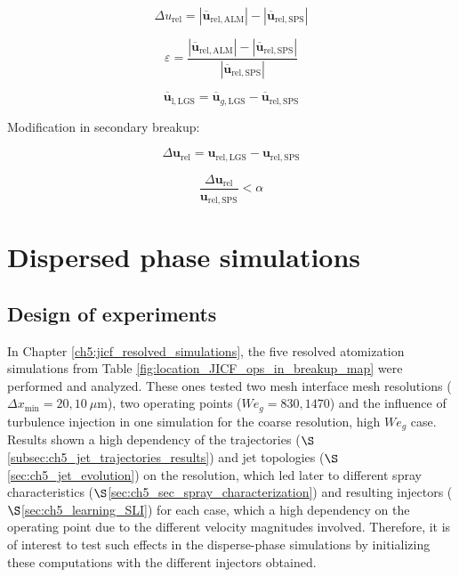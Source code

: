 \begin{equation}
\Delta u_\mathrm{rel} = | \overline{\textbf{u}}_\mathrm{rel,ALM}| - |\overline{\textbf{u}}_\mathrm{rel,SPS}|
\end{equation}

\begin{equation}
\varepsilon =  \frac{|\overline{\textbf{u}}_\mathrm{rel,ALM}| - |\overline{\textbf{u}}_\mathrm{rel,SPS}|}{|\overline{\textbf{u}}_\mathrm{rel,SPS}|} 
\end{equation}

\begin{equation}
\overline{\textbf{u}}_\mathrm{l,LGS} = \overline{\textbf{u}}_{g,\mathrm{LGS}} - \overline{\textbf{u}}_\mathrm{rel,SPS}
\end{equation}

Modification in secondary breakup:

\begin{equation}
\Delta \textbf{u}_\mathrm{rel} = \textbf{u}_\mathrm{rel,LGS} - \textbf{u}_\mathrm{rel,SPS}
\end{equation}

\begin{equation}
\frac{\Delta \textbf{u}_\mathrm{rel}}{\textbf{u}_\mathrm{rel,SPS}} < \alpha 
\end{equation}


\section{Dispersed phase simulations}


\subsection{Design of experiments}


In Chapter \ref{ch5:jicf_resolved_simulations}, the five resolved atomization simulations from Table \ref{fig:location_JICF_ops_in_breakup_map} were performed and analyzed. These ones tested two mesh interface mesh resolutions ($\Delta x_\mathrm{min} = 20, 10~\mu$m), two operating points ($We_g = 830, 1470$) and the influence of turbulence injection in one simulation for the coarse resolution, high $We_g$ case. Results shown a high dependency of the trajectories ($\S$\ref{subsec:ch5_jet_trajectories_results}) and jet topologies ($\S$\ref{sec:ch5_jet_evolution}) on the resolution, which led later to different spray characteristics ($\S$\ref{sec:ch5_sec_spray_characterization}) and resulting injectors ($\S$\ref{sec:ch5_learning_SLI}) for each case, which a high dependency on the operating point due to the different velocity magnitudes involved. Therefore, it is of interest to test such effects in the disperse-phase simulations by initializing these computations with the different injectors obtained.

